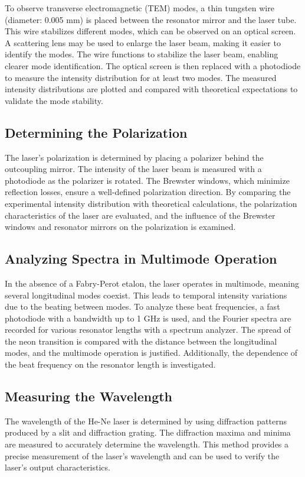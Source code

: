 To observe transverse electromagnetic (TEM) modes, a thin tungsten wire (diameter: 0.005 mm) is placed between the resonator mirror and the laser tube. This wire stabilizes different modes, which can be observed on an optical screen. A scattering lens may be used to enlarge the laser beam, making it easier to identify the modes. The wire functions to stabilize the laser beam, enabling clearer mode identification. The optical screen is then replaced with a photodiode to measure the intensity distribution for at least two modes. The measured intensity distributions are plotted and compared with theoretical expectations to validate the mode stability.

\subsection{Determining the Polarization}

The laser's polarization is determined by placing a polarizer behind the outcoupling mirror. The intensity of the laser beam is measured with a photodiode as the polarizer is rotated. The Brewster windows, which minimize reflection losses, ensure a well-defined polarization direction. By comparing the experimental intensity distribution with theoretical calculations, the polarization characteristics of the laser are evaluated, and the influence of the Brewster windows and resonator mirrors on the polarization is examined.

\subsection{Analyzing Spectra in Multimode Operation}

In the absence of a Fabry-Perot etalon, the laser operates in multimode, meaning several longitudinal modes coexist. This leads to temporal intensity variations due to the beating between modes. To analyze these beat frequencies, a fast photodiode with a bandwidth up to 1 GHz is used, and the Fourier spectra are recorded for various resonator lengths with a spectrum analyzer. The spread of the neon transition is compared with the distance between the longitudinal modes, and the multimode operation is justified. Additionally, the dependence of the beat frequency on the resonator length is investigated.

\subsection{Measuring the Wavelength}

The wavelength of the He-Ne laser is determined by using diffraction patterns produced by a slit and diffraction grating. The diffraction maxima and minima are measured to accurately determine the wavelength. This method provides a precise measurement of the laser's wavelength and can be used to verify the laser's output characteristics.
